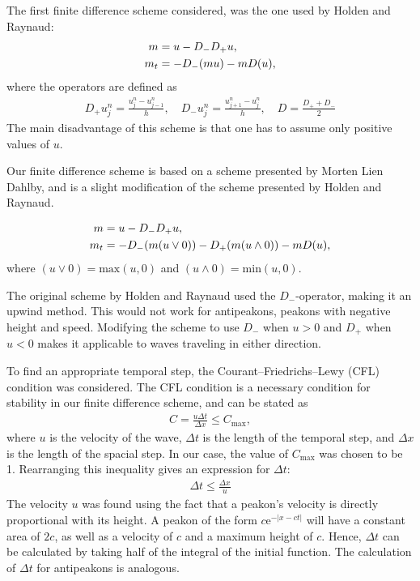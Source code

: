 The first finite difference scheme considered, was the one used by Holden and Raynaud: \cite{holden2006convergence}
\begin{align}
m &= u - D_{-}D_{+}u, \notag \\ 
m_t &= -D_{-}(mu) - mD(u),
\end{align}
where the operators are defined as
\begin{align}
\label{eq:operators}
D_{+}u_{j}^{n} = \frac{u_{j}^{n}-u_{j-1}^{n}}{h},\quad
D_{-}u_{j}^{n} = \frac{u_{j+1}^{n}-u_{j}^{n}}{h},\quad
D = \frac{D_{+}+D_{-}}{2}
\end{align}
The main disadvantage of this scheme is that one has to assume only positive values of $u$.

Our finite difference scheme is based on a scheme presented by Morten Lien Dahlby\cite{dahlby2007geometric}, and is a slight modification of the scheme presented by Holden and Raynaud.

\begin{align}
m &= u - D_{-}D_{+}u, \notag \\ 
m_t &= -D_{-}(m(u \vee 0)) -D_{+}(m(u \wedge 0)) - mD(u), 
\end{align}
where $(u \vee 0) = \text{max}(u,0)$ and $(u \wedge 0) = \text{min}(u,0)$.

The original scheme by Holden and Raynaud used the $D_{-}$-operator, making it an upwind method. This would not work for antipeakons, peakons with negative height and speed. Modifying the scheme to use  $D_{-}$ when $u > 0$ and $D_{+}$ when $ u < 0$ makes it applicable to waves traveling in either direction. 

To find an appropriate temporal step, the Courant–Friedrichs–Lewy (CFL) condition was considered. The CFL condition is a necessary condition for stability in our finite difference scheme, and can be stated as
\begin{align}
C = \frac{u\Delta t}{\Delta x} \leq C_{\text{max}},
\end{align}
where $u$ is the velocity of the wave, $\Delta t$ is the length of the temporal step, and $\Delta x$ is the length of the spacial step. In our case, the value of $C_{\text{max}}$ was chosen to be 1. Rearranging this inequality gives an expression for $\Delta t$:
\begin{align}
\Delta t \leq \frac{\Delta x}{u}
\end{align}
The velocity $u$ was found using the fact that a peakon's velocity is directly proportional with its height. A peakon of the form $c\text{e}^{-|x-ct|}$ will have a constant area of $2c$, as well as a velocity of $c$ and a maximum height of $c$. Hence, $\Delta t$ can be calculated by taking half of the integral of the initial function. The calculation of $\Delta t$ for antipeakons is analogous. \\


